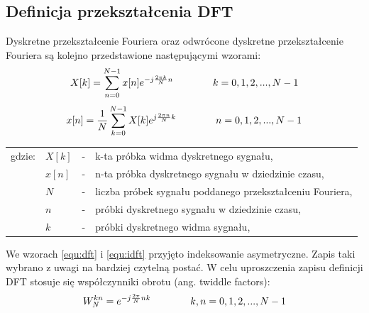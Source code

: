 \subsection{Definicja przekształcenia DFT}
Dyskretne przekształcenie Fouriera oraz odwrócone dyskretne przekształcenie Fouriera są kolejno przedstawione następującymi wzorami:
\begin{equation} \label{equ:dft}
\openup\jot
\begin{aligned}[t]
X[k] = \sum_{n=0}^{N-1} x[n]e^{-j\frac{2\pi k}{N}n} \\ 
\end{aligned}
\qquad\qquad %
\begin{aligned}[t]
k = 0, 1, 2, ..., N - 1 \\
\end{aligned}
\end{equation}
\begin{equation} \label{equ:idft}
\openup\jot
\begin{aligned}[t]
x[n] = \frac{1}{N}\sum_{k=0}^{N-1} X[k]e^{j\frac{2\pi n}{N}k}  \\  
\end{aligned}
\qquad\qquad %
\begin{aligned}[t]
 n = 0, 1, 2, ..., N - 1 \\
 \end{aligned}
\end{equation}
\begin{tabular}{ l l l l}
	gdzie: & $X[k]$ &  - & k-ta próbka widma dyskretnego sygnału, \\
	&	$x[n]$ & - &  n-ta próbka dyskretnego sygnału w dziedzinie czasu, \\
	&	$N$ & - &  liczba próbek sygnału poddanego przekształceniu Fouriera,\\
	&	$n$ & - &  próbki dyskretnego sygnału w dziedzinie czasu, \\
	&	$k$ & - &  próbki dyskretnego widma sygnału, \\
\end{tabular}

We wzorach \ref{equ:dft} i \ref{equ:idft} przyjęto indeksowanie asymetryczne. Zapis taki wybrano z uwagi na bardziej czytelną postać. W celu uproszczenia zapisu definicji DFT stosuje się współczynniki obrotu (ang. twiddle factors):
\begin{equation} \label{equ:twid_fact}
\openup\jot
\begin{aligned}[t]
	W_{N}^{kn} = e^{-j\frac{2\pi}{N}nk}  \\
\end{aligned}
\qquad\qquad %
\begin{aligned}[t]
   k, n = 0, 1, 2, ..., N - 1 \\
\end{aligned}
\end{equation}

